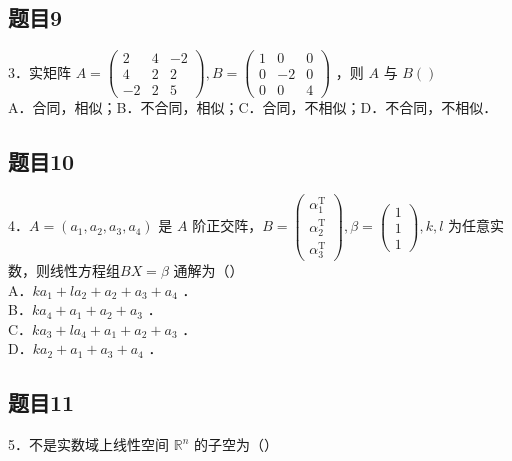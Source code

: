 \documentclass{article}
\begin{document}
\subsection{题目9}
3．实矩阵 \(A=\left(\begin{array}{ccc}2 & 4 & -2 \\ 4 & 2 & 2 \\ -2 & 2 & 5\end{array}\right), B=\left(\begin{array}{ccc}1 & 0 & 0 \\ 0 & -2 & 0 \\ 0 & 0 & 4\end{array}\right)\) ，则 \(A\) 与 \(B()\)\\
A．合同，相似；B．不合同，相似；C．合同，不相似；D．不合同，不相似．

\subsection{题目10}
4．\(A=\left(a_{1}, a_{2}, a_{3}, a_{4}\right)\) 是 \(A\) 阶正交阵，\(B=\left(\begin{array}{l}\alpha_{1}^{\mathrm{T}} \\ \alpha_{2}^{\mathrm{T}} \\ \alpha_{3}^{\mathrm{T}}\end{array}\right), \beta=\left(\begin{array}{l}1 \\ 1 \\ 1\end{array}\right), k, l\) 为任意实数，则线性方程组\(B X=\beta\) 通解为（）\\
A．\(k a_{1}+l a_{2}+a_{2}+a_{3}+a_{4}\) ．\\
B．\(k a_{4}+a_{1}+a_{2}+a_{3}\) ．\\
C．\(k a_{3}+l a_{4}+a_{1}+a_{2}+a_{3}\) ．\\
D．\(k a_{2}+a_{1}+a_{3}+a_{4}\) ．

\subsection{题目11}
5．不是实数域上线性空间 \(\mathbb{R}^{n}\) 的子空为（）
\end{document}
